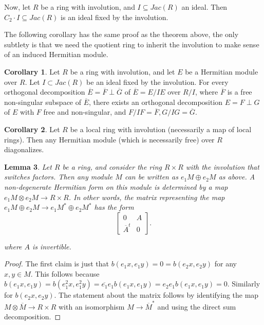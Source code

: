 \documentclass[edeposit,fullpage]{uiucthesis2009}
\theoremstyle{plain}
\newtheorem{lemma}{Lemma}
\numberwithin{lemma}{section}
\theoremstyle{definition}
\newtheorem{corollary}[lemma]{Corollary}
\begin{document}
Now, let $R$ be a ring with involution, and $I \subseteq Jac(R)$ an
ideal. Then $C_2\cdot I \subseteq Jac(R)$ is an ideal fixed by the
involution. 

The following corollary has the same proof as the theorem above, the
only subtlety is that we need the quotient ring to inherit the
involution to make sense of an induced Hermitian module.

\begin{corollary}\label{cor:semiloc_quot_form}
Let $R$ be a ring with involution, and let $E$ be a Hermitian module over
$R$. Let $I \subset Jac(R)$ be an ideal fixed by the involution. For every orthogonal decomposition $\overline E = \overline F
\perp \overline G$ of $\overline E = E/IE$ over $R/I$, where $\overline
F$ is a free non-singular subspace of $\overline E$, there exists an
orthogonal decomposition $E = F \perp G$ of $E$ with $F$ free and
non-singular, and $F/IF = \overline F, G/IG = \overline G$.
\end{corollary}

\begin{corollary}
Let $R$ be a local ring with involution (necessarily a map of local
rings). Then any Hermitian module (which is necessarily free)
over $R$ diagonalizes. 
\end{corollary}

\begin{lemma} 
Let $R$ be a ring, and consider the ring $R \times R$ with the
involution that switches factors. Then any module $M$ can be
written as $e_1M \oplus e_2M$ as above. A non-degenerate Hermitian form on this
module is determined by a map $e_1M \otimes e_2M \rightarrow R \times
R$. In other words, the matrix representing the map $e_1M \oplus e_2M
\rightarrow e_1M^* \oplus e_2M^*$ has the form
\[
\begin{bmatrix}
0 & A \\
\overline{A}^t & 0
\end{bmatrix}.
\]

where $A$ is invertible. 
\end{lemma}

\begin{proof}
The first claim is just that $b(e_1x,e_1y) = 0 = b(e_2x,e_2y)$ for any
$x,y \in M$. This follows because $b(e_1x,e_1y) = b(e_1^2x,e_1^2y) =
\overline{e_1}e_1b(e_1x,e_1y) = e_2e_1b(e_1x,e_1y) = 0$. Similarly for
$b(e_2x,e_2y)$. The statement about the matrix follows by identifying
the map $M \otimes \overline M \rightarrow R \times R$ with an isomorphism $M
\rightarrow \overline M^*$ and using the direct sum decomposition. 
\end{proof}
\end{document}
